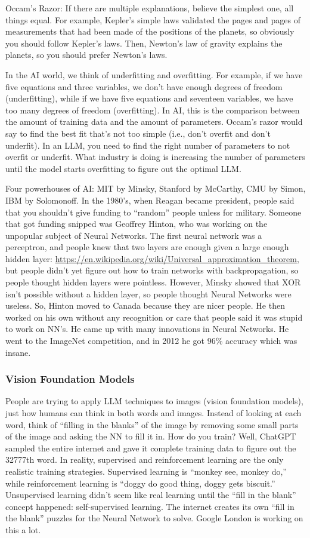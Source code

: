 \documentclass[12pt]{article}
\begin{document}
Occam's Razor: If there are multiple explanations, believe the simplest one, all things equal. For example, Kepler's simple laws validated the pages and pages of measurements that had been made of the positions of the planets, so obviously you should follow Kepler's laws. Then, Newton's law of gravity explains the planets, so you should prefer Newton's laws.

In the AI world, we think of underfitting and overfitting. For example, if we have five equations and three variables, we don't have enough degrees of freedom (underfitting), while if we have five equations and seventeen variables, we have too many degrees of freedom (overfitting). In AI, this is the comparison between the amount of training data and the amount of parameters. Occam's razor would say to find the best fit that's not too simple (i.e., don't overfit and don't underfit). In an LLM, you need to find the right number of parameters to not overfit or underfit. What industry is doing is increasing the number of parameters until the model starts overfitting to figure out the optimal LLM. 

Four powerhouses of AI: MIT by Minsky, Stanford by McCarthy, CMU by Simon, IBM by Solomonoff. In the 1980's, when Reagan became president, people said that you shouldn't give funding to ``random'' people unless for military. Someone that got funding snipped was Geoffrey Hinton, who was working on the unpopular subject of Neural Networks. The first neural network was a perceptron, and people knew that two layers are enough given a large enough hidden layer:
\url{https://en.wikipedia.org/wiki/Universal_approximation_theorem}, but people didn't yet figure out how to train networks with backpropagation, so people thought hidden layers were pointless. However, Minsky showed that XOR isn't possible without a hidden layer, so people thought Neural Networks were useless. So, Hinton moved to Canada because they are nicer people. He then worked on his own without any recognition or care that people said it was stupid to work on NN's. He came up with many innovations in Neural Networks. He went to the ImageNet competition, and in 2012 he got 96\% accuracy which was insane. 
\subsubsection{Vision Foundation Models}
People are trying to apply LLM techniques to images (vision foundation models), just how humans can think in both words and images. Instead of looking at each word, think of ``filling in the blanks'' of the image by removing some small parts of the image and asking the NN to fill it in. How do you train? Well, ChatGPT sampled the entire internet and gave it complete training data to figure out the 32777th word. In reality, supervised and reinforcement learning are the only realistic training strategies. Supervised learning is ``monkey see, monkey do,'' while reinforcement learning is ``doggy do good thing, doggy gets biscuit.'' Unsupervised learning didn't seem like real learning until the ``fill in the blank'' concept happened: self-supervised learning. The internet creates its own ``fill in the blank'' puzzles for the Neural Network to solve. Google London is working on this a lot. 
\end{document}
